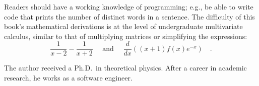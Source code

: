 Readers should have a working knowledge of programming; e.g.,
be able to write code that prints the number of distinct words in
a sentence. The difficulty of this book\textsf{'}s mathematical derivations
is at the level of undergraduate multivariate calculus, similar to that of multiplying
matrices or simplifying the expressions:
\[
\frac{1}{x-2}-\frac{1}{x+2}\quad\text{ and }\quad\frac{d}{dx}\left((x+1)f(x)e^{-x}\right)\quad.
\]

The author received a Ph.D. in theoretical physics. After a career in academic research, he works as a software engineer.


